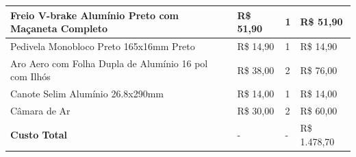 \begin{table}[!htbp]
\begin{center}
{\begin{tabular}{|p{4cm}|p{4cm}|p{3cm}|p{4cm}|}
					Freio V-brake Alumínio Preto com Maçaneta Completo & R\$ 51,90 & 1 & R\$ 51,90 \\\hline
					Pedivela Monobloco Preto 165x16mm Preto & R\$ 14,90 & 1 & R\$ 14,90 \\\hline
					Aro Aero com Folha Dupla de Alumínio 16 pol com Ilhós & R\$ 38,00 & 2 & R\$ 76,00 \\\hline
					Canote Selim Alumínio 26.8x290mm & R\$ 14,00 & 1 & R\$ 14,00 \\\hline
					Câmara de Ar & R\$ 30,00 & 2 & R\$ 60,00 \\\hline\hline
					\textbf{Custo Total} & - & - & R\$ 1.478,70 \\\hline
				\end{tabular}
			}
		\end{center}
	\end{table}